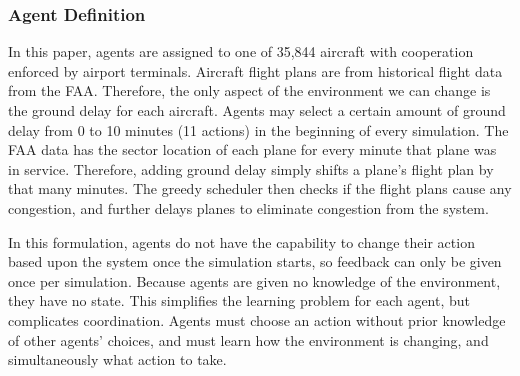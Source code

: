 \documentclass[letterpaper]{article}
\begin{document}
\subsubsection{Agent Definition}
In this paper, agents are assigned to one of 35,844 aircraft with cooperation enforced by airport terminals. Aircraft flight plans are from historical flight data from the FAA. Therefore, the only aspect of the environment we can change is the ground delay for each aircraft. Agents may select a certain amount of ground delay from 0 to 10 minutes (11 actions) in the beginning of every simulation. The FAA data has the sector location of each plane for every minute that plane was in service. Therefore, adding ground delay simply shifts a plane's flight plan by that many minutes. The greedy scheduler then checks if the flight plans cause any congestion, and further delays planes to eliminate congestion from the system.

In this formulation, agents do not have the capability to change their action based upon the system once the simulation starts, so feedback can only be given once per simulation. Because agents are given no knowledge of the environment, they have no state. This simplifies the learning problem for each agent, but complicates coordination. Agents must choose an action without prior knowledge of other agents' choices, and must learn how the environment is changing, and simultaneously what action to take.



\end{document}
